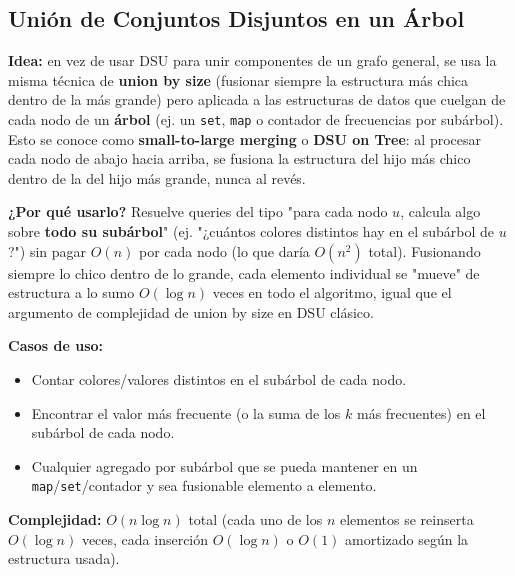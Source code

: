 \documentclass[10pt,a4paper,twocolumn]{article}
\begin{document}
\subsection{Unión de Conjuntos Disjuntos en un Árbol}

\textbf{Idea:} en vez de usar DSU para unir componentes de un grafo
general, se usa la misma técnica de \textbf{union by size} (fusionar
siempre la estructura más chica dentro de la más grande) pero
aplicada a las estructuras de datos que cuelgan de cada nodo de un
\textbf{árbol} (ej. un \texttt{set}, \texttt{map} o contador de
frecuencias por subárbol). Esto se conoce como \textbf{small-to-large
merging} o \textbf{DSU on Tree}: al procesar cada nodo de abajo hacia
arriba, se fusiona la estructura del hijo más chico dentro de la del
hijo más grande, nunca al revés.

\textbf{¿Por qué usarlo?} Resuelve queries del tipo "para cada nodo
$u$, calcula algo sobre \textbf{todo su subárbol}" (ej. "¿cuántos
colores distintos hay en el subárbol de $u$?") sin pagar
$O(n)$ por cada nodo (lo que daría $O(n^2)$ total). Fusionando
siempre lo chico dentro de lo grande, cada elemento individual se
"mueve" de estructura a lo sumo $O(\log n)$ veces en todo el
algoritmo, igual que el argumento de complejidad de union by size en
DSU clásico.

\textbf{Casos de uso:}

\begin{itemize}
    \item Contar colores/valores distintos en el subárbol de cada
    nodo.
    \item Encontrar el valor más frecuente (o la suma de los $k$ más
    frecuentes) en el subárbol de cada nodo.
    \item Cualquier agregado por subárbol que se pueda mantener en un
    \texttt{map}/\texttt{set}/contador y sea fusionable elemento a
    elemento.
\end{itemize}

\textbf{Complejidad:} $O(n \log n)$ total (cada uno de los $n$
elementos se reinserta $O(\log n)$ veces, cada inserción
$O(\log n)$ o $O(1)$ amortizado según la estructura usada).
\end{document}
